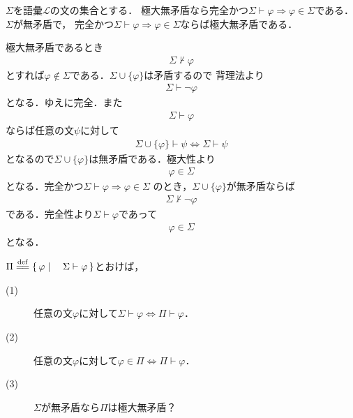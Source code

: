 \documentclass[a4j,10.5pt,oneside,openany]{jsbook}
\theoremstyle{mystyle}
\newcommand{\Set}[2]{\left\{\, #1 \mid \quad #2\, \right\}} %
\newcommand{\defeq}{\overset{\mathrm{def}}{=\joinrel=}} %
\begin{document}
	\begin{screen}
		$\Sigma$を語彙$\mathcal{L}$の文の集合とする．
		極大無矛盾なら完全かつ$\Sigma \vdash \varphi
		\Longrightarrow \varphi \in \Sigma$である．$\Sigma$が無矛盾で，
		完全かつ$\Sigma \vdash \varphi
		\Longrightarrow \varphi \in \Sigma$ならば極大無矛盾である．
	\end{screen}
	
	極大無矛盾であるとき
	\begin{align}
		\Sigma \not\vdash \varphi
	\end{align}
	とすれば$\varphi \notin \Sigma$である．$\Sigma \cup \{\varphi\}$は矛盾するので
	背理法より
	\begin{align}
		\Sigma \vdash \neg \varphi
	\end{align}
	となる．ゆえに完全．また
	\begin{align}
		\Sigma \vdash \varphi
	\end{align}
	ならば任意の文$\psi$に対して
	\begin{align}
		\Sigma \cup \{\varphi\} \vdash \psi \Longleftrightarrow \Sigma \vdash \psi
	\end{align}
	となるので$\Sigma \cup \{\varphi\}$は無矛盾である．極大性より
	\begin{align}
		\varphi \in \Sigma
	\end{align}
	となる．完全かつ$\Sigma \vdash \varphi \Longrightarrow \varphi \in \Sigma$
	のとき，$\Sigma \cup \{\varphi\}$が無矛盾ならば
	\begin{align}
		\Sigma \not\vdash \neg \varphi
	\end{align}
	である．完全性より$\Sigma \vdash \varphi$であって
	\begin{align}
		\varphi \in \Sigma
	\end{align}
	となる．
	
	\begin{screen}
		$\Pi \defeq \Set{\varphi}{\Sigma \vdash \varphi}$とおけば，
		\begin{description}
			\item[(1)] 任意の文$\varphi$に対して$\Sigma \vdash \varphi \Longleftrightarrow \Pi \vdash \varphi$．
			\item[(2)] 任意の文$\varphi$に対して$\varphi \in \Pi \Longleftrightarrow \Pi \vdash \varphi$．
			\item[(3)] $\Sigma$が無矛盾なら$\Pi$は極大無矛盾？
		\end{description}
	\end{screen}
	
\end{document}
